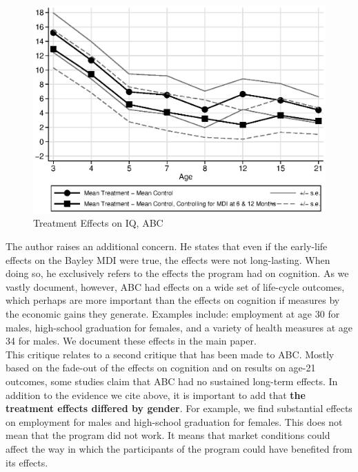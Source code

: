 \begin{figure}[H]
		\caption{Treatment Effects on IQ, ABC} \label{fig:treatiqsabc}
		\includegraphics[width=.9\columnwidth]{output/abc_mdifixing_2.eps}
\end{figure}

\noindent The author raises an additional concern. He states that even if the early-life effects on the Bayley MDI were true, the effects were not long-lasting. When doing so, he exclusively refers to the effects the program had on cognition. As we vastly document, however, ABC had effects on a wide set of life-cycle outcomes, which perhaps are more important than the effects on cognition if measures by the economic gains they generate. Examples include: employment at age 30 for males, high-school graduation for females, and a variety of health measures at age 34 for males. We document these effects in the main paper.\\

\noindent This critique relates to a second critique that has been made to ABC. Mostly based on the fade-out of the effects on cognition and on results on age-21 outcomes, some studies claim that ABC had no sustained long-term effects. In addition to the evidence we cite above, it is important to add that \textbf{the treatment effects differed by gender}. For example, we find substantial effects on employment for males and high-school graduation for females. This does not mean that the program did not work. It means that market conditions could affect the way in which the participants of the program could have benefited from its effects.\\

